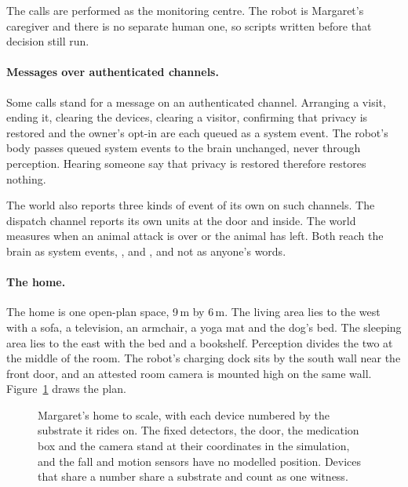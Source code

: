 The  calls are performed as the monitoring centre. The robot is Margaret's caregiver
and there is no separate human one, so scripts written before that decision still run.

\paragraph{Messages over authenticated channels.} Some calls stand for a message on an authenticated
channel. Arranging a visit, ending it, clearing the devices, clearing a visitor, confirming that
privacy is restored and the owner's opt-in are each queued as a system event. The robot's body
passes queued system events to the brain unchanged, never through perception. Hearing someone say
that privacy is restored therefore restores nothing.

The world also reports three kinds of event of its own on such channels. The dispatch channel reports
its own units at the door and inside. The world measures when an animal attack is over or the animal
has left. Both reach the brain as system events, ,
 and , and not as anyone's words.

\paragraph{The home.} The home is one open-plan space, 9\,m by 6\,m. The living area lies to the west
with a sofa, a television, an armchair, a yoga mat and the dog's bed. The sleeping area lies to the
east with the bed and a bookshelf. Perception divides the two at the middle of the room. The robot's
charging dock sits by the south wall near the front door, and an attested room camera is mounted high
on the same wall. Figure~\ref{fig:home-plan} draws the plan.

\begin{figure}[t]
\centering
\resizebox{\textwidth}{!}{}
\caption{Margaret's home to scale, with each device numbered by the substrate it rides on. The fixed
detectors, the door, the medication box and the camera stand at their coordinates in the simulation,
and the fall and motion sensors have no modelled position. Devices that share a number share a
substrate and count as one witness.}
\label{fig:home-plan}
\end{figure}

